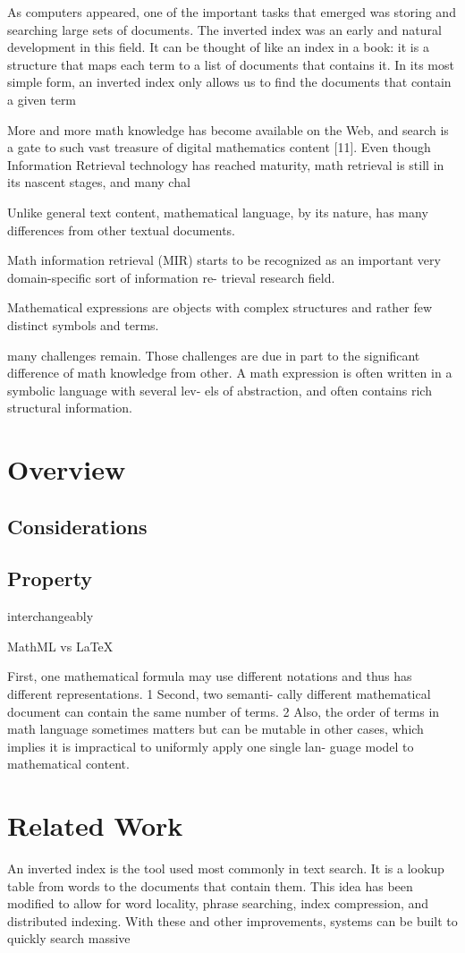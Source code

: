 As computers appeared, one of the important tasks that emerged was
storing and searching large sets of documents. The inverted index was an
early and natural development in this field. It can be thought of like an index
in a book: it is a structure that maps each term to a list of documents that
contains it. In its most simple form, an inverted index only allows us to find
the documents that contain a given term

More and more math knowledge has become available on the Web, and search
is a gate to such vast treasure of digital mathematics content [11]. Even though
Information Retrieval technology has reached maturity, math retrieval is still in
its nascent stages, and many chal

Unlike general text content, mathematical language, by its nature, has many differences from other textual documents. 

Math information retrieval (MIR) starts to be recognized
as an important very domain-specific sort of information re-
trieval research field.

Mathematical expressions are objects with complex
structures and rather few distinct symbols and terms.

many challenges remain. Those challenges are due in part
to the significant difference of math knowledge from other.
A math expression is often written in a symbolic language with several lev-
els of abstraction, and often contains rich structural information.

\section{Overview}
\subsection{Considerations}
\subsection{Property}

interchangeably 

MathML vs LaTeX

First,
one mathematical formula may use different notations and
thus has different representations. 1 Second, two semanti-
cally different mathematical document can contain the same
number of terms. 2 Also, the order of terms in math language
sometimes matters but can be mutable in other cases, which
implies it is impractical to uniformly apply one single lan-
guage model to mathematical content.

\section{Related Work}

An inverted index is the tool used most commonly in text search. It is
a lookup table from words to the documents that contain them. This idea has
been modified to allow for word locality, phrase searching, index compression,
and distributed indexing. With these and other improvements, systems can
be built to quickly search massive
